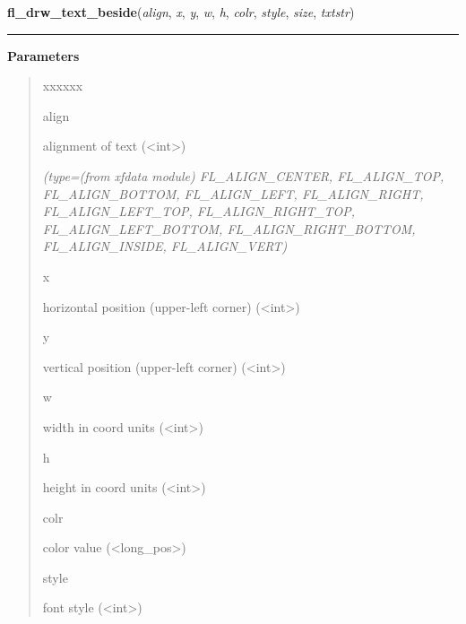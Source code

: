 \hspace{.8\funcindent}\begin{boxedminipage}{\funcwidth}

    \raggedright \textbf{fl\_drw\_text\_beside}(\textit{align}, \textit{x}, \textit{y}, \textit{w}, \textit{h}, \textit{colr}, \textit{style}, \textit{size}, \textit{txtstr})

    \vspace{-1.5ex}

    \rule{\textwidth}{0.5\fboxrule}
\setlength{\parskip}{2ex}
\setlength{\parskip}{1ex}
      \textbf{Parameters}
      \vspace{-1ex}

      \begin{quote}
        \begin{Ventry}{xxxxxx}

          \item[align]

          alignment of text ({\textless}int{\textgreater})

            {\it (type=(from xfdata module) FL\_ALIGN\_CENTER, FL\_ALIGN\_TOP, FL\_ALIGN\_BOTTOM, 
FL\_ALIGN\_LEFT, FL\_ALIGN\_RIGHT, FL\_ALIGN\_LEFT\_TOP, 
FL\_ALIGN\_RIGHT\_TOP, FL\_ALIGN\_LEFT\_BOTTOM, FL\_ALIGN\_RIGHT\_BOTTOM, 
FL\_ALIGN\_INSIDE, FL\_ALIGN\_VERT)}

          \item[x]

          horizontal position (upper-left corner) 
          ({\textless}int{\textgreater})

          \item[y]

          vertical position (upper-left corner) 
          ({\textless}int{\textgreater})

          \item[w]

          width in coord units ({\textless}int{\textgreater})

          \item[h]

          height in coord units ({\textless}int{\textgreater})

          \item[colr]

          color value ({\textless}long\_pos{\textgreater})

          \item[style]

          font style ({\textless}int{\textgreater})


\end{Ventry}
\end{quote}
\end{boxedminipage}
